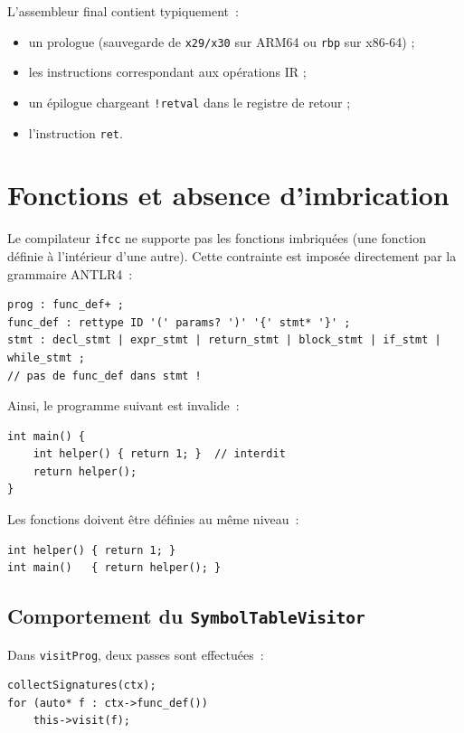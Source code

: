 \documentclass[11pt,a4paper]{article}
\begin{document}
L'assembleur final contient typiquement~:

\begin{itemize}
  \item un prologue (sauvegarde de \texttt{x29/x30} sur ARM64 ou \texttt{rbp} sur x86-64) ;
  \item les instructions correspondant aux opérations IR ;
  \item un épilogue chargeant \texttt{!retval} dans le registre de retour ;
  \item l'instruction \texttt{ret}.
\end{itemize}

\section{Fonctions et absence d'imbrication}

Le compilateur \texttt{ifcc} ne supporte pas les fonctions imbriquées (une fonction définie à l'intérieur d'une autre). Cette contrainte est imposée directement par la grammaire ANTLR4~:

\begin{lstlisting}
prog : func_def+ ;
func_def : rettype ID '(' params? ')' '{' stmt* '}' ;
stmt : decl_stmt | expr_stmt | return_stmt | block_stmt | if_stmt | while_stmt ;
// pas de func_def dans stmt !
\end{lstlisting}

Ainsi, le programme suivant est invalide~:

\begin{lstlisting}
int main() {
    int helper() { return 1; }  // interdit
    return helper();
}
\end{lstlisting}

Les fonctions doivent être définies au même niveau~:

\begin{lstlisting}
int helper() { return 1; }
int main()   { return helper(); }
\end{lstlisting}

\subsection{Comportement du \texttt{SymbolTableVisitor}}

Dans \texttt{visitProg}, deux passes sont effectuées~:

\begin{lstlisting}
collectSignatures(ctx);
for (auto* f : ctx->func_def())
    this->visit(f);
\end{lstlisting}
\end{document}

